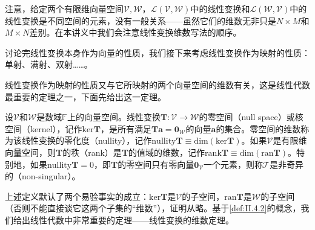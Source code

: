 \documentclass[main.tex]{subfiles}
\begin{document}
注意，给定两个有限维向量空间$\mathcal{V},\mathcal{W}$，$\mathcal{L}\left(\mathcal{V},\mathcal{W}\right)$中的线性变换和$\mathcal{L}\left(\mathcal{W},\mathcal{V}\right)$中的线性变换是不同空间的元素，没有一般关系——虽然它们的维数无非只是$N\times M$和$M\times N$差别。在本讲义中我们会注意线性变换维数写法的顺序。

讨论完线性变换本身作为向量的性质，我们接下来考虑线性变换作为映射的性质：单射、满射、双射……。

线性变换作为映射的性质又与它所映射的两个向量空间的维数有关，这是线性代数最重要的定理之一，下面先给出这一定理。

\begin{definition}\label{def:II.4.2}
设$\mathcal{V}$和$\mathcal{W}$是数域$\mathbb{F}$上的向量空间。线性变换$\mathbf{T}:\mathcal{V}\rightarrow\mathcal{W}$的零空间（null space）或核空间（kernel），记作$\mathrm{ker}\mathbf{T}$，是所有满足$\mathbf{Ta}=\mathbf{0}_\mathcal{W}$的向量$\mathbf{a}$的集合。零空间的维数称为该线性变换的零化度（nullity），记作$\mathrm{nullity}\mathbf{T}\equiv\mathrm{dim}\left(\mathrm{ker}\mathbf{T}\right)$。如果$\mathcal{V}$是有限维向量空间，则$\mathbf{T}$的秩（rank）是$\mathbf{T}$的值域的维数，记作$\mathrm{rank}\mathbf{T}\equiv\mathrm{dim}\left(\mathrm{ran}\mathbf{T}\right)$。特别地，如果$\mathrm{nullity}\mathbf{T}=0$，即$\mathbf{T}$的零空间只有零向量$\mathbf{0}_\mathcal{V}$一个元素，则称$\mathcal{T}$是非奇异的（non-singular）。
\end{definition}

上述定义默认了两个易验事实的成立：$\mathrm{ker}\mathbf{T}$是$\mathcal{V}$的子空间，$\mathrm{ran}\mathbf{T}$是$\mathcal{W}$的子空间（否则不能直接谈它这两个子集的“维数”），证明从略\cite[\S7.3“2.线性变换的简单性质(4)”p.~177]{周胜林2012线性代数}。基于\ref{def:II.4.2}的概念，我们给出线性代数中非常重要的定理——线性变换的维数定理\cite[\S7.3“2.线性变换的简单性质(5)”p.~178]{周胜林2012线性代数}。
\end{document}
